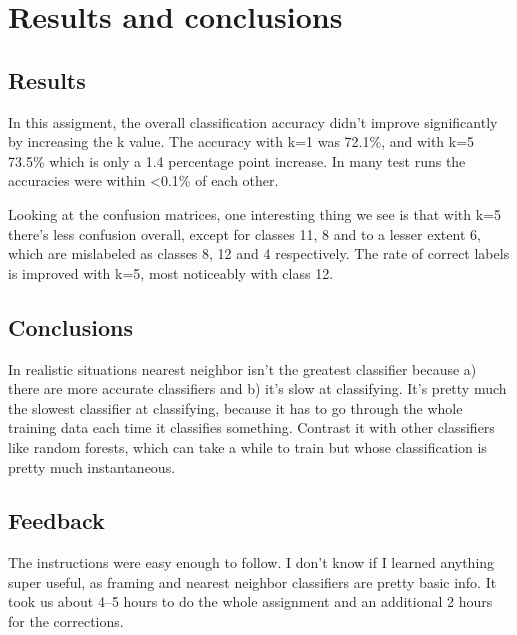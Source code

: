 \section{Results and conclusions}

\subsection{Results}
In this assigment, the overall classification accuracy didn't improve
significantly by increasing the k value. The accuracy with k=1 was 72.1\%, and
with k=5 73.5\% which is only a 1.4 percentage point increase. In many test
runs the accuracies were within <0.1\% of each other.

Looking at the confusion matrices, one interesting thing we see is that with
k=5 there's less confusion overall, except for classes 11, 8 and to a lesser
extent 6, which are mislabeled as classes 8, 12 and 4 respectively. The rate of
correct labels is improved with k=5, most noticeably with class 12.

\subsection{Conclusions}
In realistic situations nearest neighbor isn't the greatest classifier because
a) there are more accurate classifiers and b) it's slow at classifying. It's
pretty much the slowest classifier at classifying, because it has to go through
the whole training data each time it classifies something. Contrast it with
other classifiers like random forests, which can take a while to train but
whose classification is pretty much instantaneous.

\subsection{Feedback}
The instructions were easy enough to follow. I don't know if I learned anything
super useful, as framing and nearest neighbor classifiers are pretty basic
info. It took us about 4--5 hours to do the whole assignment and an additional 2
hours for the corrections.

